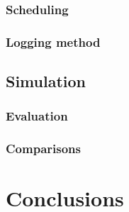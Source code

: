 \documentclass{article}
\begin{document}
\subsubsection{Scheduling}

\subsubsection{Logging method}

\subsection{Simulation}

\subsubsection{Evaluation}

\subsubsection{Comparisons}

\section{Conclusions}
\end{document}
